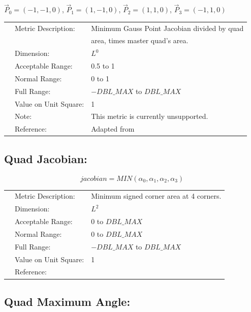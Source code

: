 \documentclass[12pt]{article}
\begin{document}
 $\vec P_0 = (-1, -1, 0)$, 
 $\vec P_1 = (1, -1, 0)$, 
 $\vec P_2 = (1, 1, 0)$, 
 $\vec P_3 = ( -1, 1, 0)$ \newline

\begin{tabular}{lll}
& Metric Description:  & Minimum Gauss Point Jacobian divided by quad \\
&                      & area, times master quad's area. \\ 
& Dimension:           & $L^0$              \\ 
& Acceptable Range:    & 0.5 to 1            \\ 
& Normal Range:        & 0 to 1        \\ 
& Full Range:          & $-DBL\_MAX$ to $DBL\_MAX$        \\ 
& Value on Unit Square:& 1 \\
& Note:                & This metric is currently unsupported. \\ 
& Reference:           &  Adapted from \cite{five} \\
\end{tabular} 


\subsection*{Quad Jacobian:}

\begin{displaymath}
jacobian = MIN \left( \alpha_0, \alpha_1, \alpha_2, \alpha_3 \right)
\end{displaymath}

\begin{tabular}{lll}
& Metric Description:  & Minimum signed corner area at 4 corners. \\
& Dimension:           & $L^2$  \\ 
& Acceptable Range:    & 0 to $DBL\_MAX$   \\ 
& Normal Range:        & 0 to $DBL\_MAX$   \\ 
& Full Range:          & $-DBL\_MAX$ to $DBL\_MAX$        \\ 
& Value on Unit Square:& 1 \\
& Reference:           &  \cite{three} \\
\end{tabular} 

\subsection*{Quad Maximum Angle:}
\end{document}
